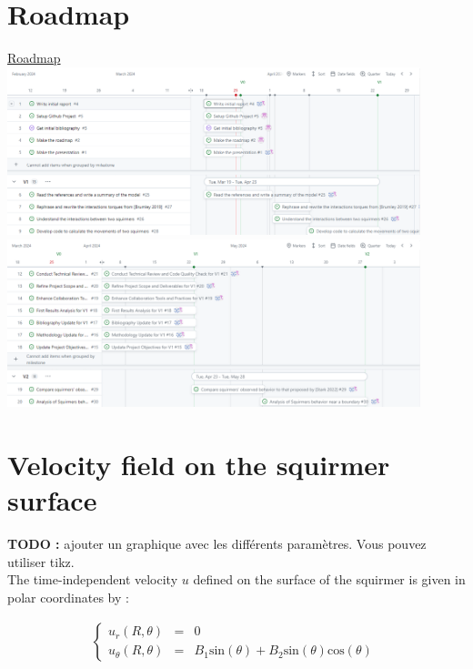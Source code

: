 \documentclass[options]{article}
\begin{document}
\section{Roadmap}
\begin{center}
    \href{https://github.com/orgs/master-csmi/projects/23/views/2}{Roadmap}
    \includegraphics[width=0.9\textwidth]{Presentation/V0/images/roadmapV0_1.png}
    \vspace{1em} %
    \includegraphics[width=0.9\textwidth]{Presentation/V0/images/roadmapV0_2.png}
\end{center}

\newpage
\section{Velocity field on the squirmer surface}

\textbf{TODO : } ajouter un graphique avec les différents paramètres. Vous 
pouvez utiliser tikz. \\


The time-independent velocity $u$ defined on the surface of the squirmer is given 
in polar coordinates by :

\begin{align*}
   \left\{\begin{array}{rcl}
      u_r(R,\theta) &=& 0 \\
      u_\theta(R,\theta) &=& B_1\mathrm{sin}(\theta)+B_2\mathrm{sin}(\theta)\mathrm{cos}(\theta)
   \end{array}\right.\;
\end{align*}
\end{document}
